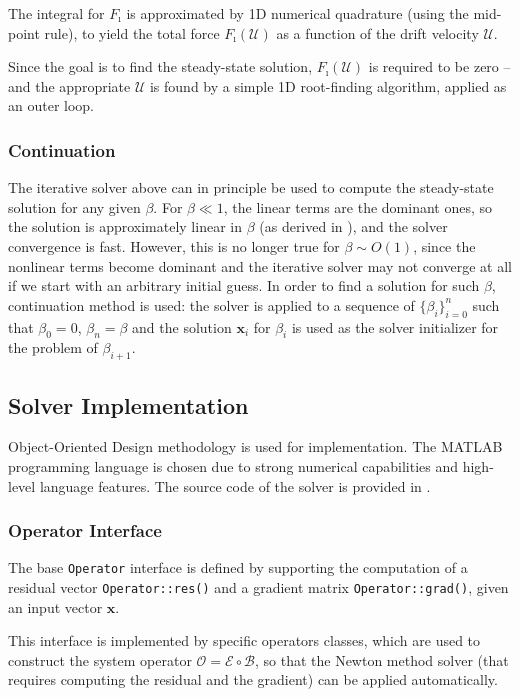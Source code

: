 \documentclass[10pt]{ijnam}
\newcommand\bx{\boldsymbol{x}}
\newcommand\cB{\mathcal{B}}
\newcommand\cE{\mathcal{E}}
\newcommand\cO{\mathcal{O}}
\newcommand\cU{\mathscr{U}}
\begin{document}
The integral for $F_\imath$ is approximated by 1D numerical quadrature
(using the mid-point rule), to yield 
the total force $F_\imath(\cU)$ as a function of the drift velocity $\cU$.

Since the goal is to find the steady-state solution, $F_\imath(\cU)$ 
is required to be zero --
and the appropriate $\cU$ is found by a simple 1D root-finding algorithm,
applied as an outer loop.

\subsubsection{Continuation}

The iterative solver above can in principle be used 
to compute the steady-state solution for any given $\beta$.
For $\beta \ll 1$, the linear terms are the dominant ones, 
so the solution is approximately linear in $\beta$ 
(as derived in \cite{yariv2010migration}), and the solver convergence is fast.
However, this is no longer true for $\beta \sim O(1)$, since the nonlinear terms become dominant
and the iterative solver may not converge at all if we start with an arbitrary initial guess.
In order to find a solution for such $\beta$, continuation method is used:
the solver is applied to a sequence of $\{\beta_i\}_{i=0}^n$ such that $\beta_0 = 0$,
$\beta_n = \beta$ and the solution $\bx_i$ for $\beta_i$ is used as the solver initializer
for the problem of $\beta_{i+1}$.

\subsection{Solver Implementation}

Object-Oriented Design methodology is used for implementation.
The MATLAB programming language is chosen due to strong numerical capabilities
and high-level language features.
The source code of the solver is provided in \cite{source}.

\subsubsection{Operator Interface}
The base \verb|Operator| interface is defined by 
supporting the computation of a residual vector \verb|Operator::res()|
and a gradient matrix \verb|Operator::grad()|, given an input vector $\bx$.

This interface is implemented by specific operators classes,
which are used to construct the system operator $\cO = \cE \circ \cB$, so that 
the Newton method solver (that requires computing the residual and the gradient) 
can be applied automatically.
\end{document}

